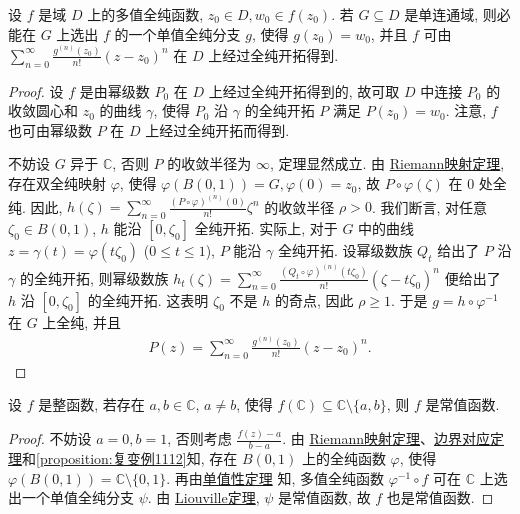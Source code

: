 \documentclass[../../main.tex]{subfiles}%
\begin{document}
\begin{theorem}[单值性定理]\label{theorem:单值性定理}
设 \(f\) 是域 \(D\) 上的多值全纯函数, \(z_0\in D, w_0\in f(z_0)\). 若 \(G\subseteq D\) 是单连通域, 则必能在 \(G\) 上选出 \(f\) 的一个单值全纯分支 \(g\), 使得 \(g(z_0)=w_0\), 并且 \(f\) 可由 \(\sum\limits_{n=0}^{\infty} \frac{g^{(n)}(z_0)}{n!}(z-z_0)^n\) 在 \(D\) 上经过全纯开拓得到.
\end{theorem}
\begin{proof}

设 \(f\) 是由幂级数 \(P_0\) 在 \(D\) 上经过全纯开拓得到的, 故可取 \(D\) 中连接 \(P_0\) 的收敛圆心和 \(z_0\) 的曲线 \(\gamma\), 使得 \(P_0\) 沿 \(\gamma\) 的全纯开拓 \(P\) 满足 \(P(z_0)=w_0\). 注意, \(f\) 也可由幂级数 \(P\) 在 \(D\) 上经过全纯开拓而得到.

不妨设 \(G\) 异于 \(\mathbb{C}\), 否则 \(P\) 的收敛半径为 \(\infty\), 定理显然成立. 由 \hyperref[theorem:Riemann映射定理]{Riemann映射定理}, 存在双全纯映射 \(\varphi\), 使得 \(\varphi(B(0,1))=G, \varphi(0)=z_0\), 故 \(P\circ \varphi(\zeta)\) 在 \(0\) 处全纯. 因此, \(h(\zeta)=\sum\limits_{n=0}^{\infty} \frac{(P\circ \varphi)^{(n)}(0)}{n!} \zeta^n\) 的收敛半径 \(\rho>0\). 我们断言, 对任意 \(\zeta_0 \in B(0,1)\), \(h\) 能沿 \([0,\zeta_0]\) 全纯开拓. 实际上, 对于 \(G\) 中的曲线 \(z=\gamma(t)=\varphi(t\zeta_0)\) (\(0\leqslant t\leqslant 1\)), \(P\) 能沿 \(\gamma\) 全纯开拓. 设幂级数族 \(Q_t\) 给出了 \(P\) 沿 \(\gamma\) 的全纯开拓, 则幂级数族 \(h_t(\zeta)=\sum\limits_{n=0}^{\infty} \frac{(Q_t \circ \varphi)^{(n)}(t\zeta_0)}{n!} (\zeta-t\zeta_0)^n\) 便给出了 \(h\) 沿 \([0,\zeta_0]\) 的全纯开拓. 这表明 \(\zeta_0\) 不是 \(h\) 的奇点, 因此 \(\rho\geqslant 1\). 于是 \(g=h\circ \varphi^{-1}\) 在 \(G\) 上全纯, 并且
\begin{align*}
P(z)=\sum_{n=0}^{\infty} \frac{g^{(n)}(z_0)}{n!} (z-z_0)^n.
\end{align*}
\end{proof}

\begin{theorem}
设 \(f\) 是整函数, 若存在 \(a,b\in\mathbb{C}\), \(a\neq b\), 使得 \(f(\mathbb{C})\subseteq \mathbb{C}\setminus\{a,b\}\), 则 \(f\) 是常值函数.
\end{theorem}
\begin{proof}
不妨设 \(a=0,b=1\), 否则考虑 \(\frac{f(z)-a}{b-a}\). 由 \hyperref[theorem:Riemann映射定理]{Riemann映射定理}、\hyperref[theorem:边界对应定理]{边界对应定理}和\cref{proposition:复变例1112}知, 存在 \(B(0,1)\) 上的全纯函数 \(\varphi\), 使得 \(\varphi(B(0,1))= \mathbb{C}\setminus\{0,1\}\). 再由\hyperref[theorem:单值性定理]{单值性定理} 知, 多值全纯函数 \(\varphi^{-1} \circ f\) 可在 \(\mathbb{C}\) 上选出一个单值全纯分支 \(\psi\). 由 \hyperref[theorem:Liouville(刘维尔)定理]{Liouville定理}, \(\psi\) 是常值函数, 故 \(f\) 也是常值函数. \end{proof}
\end{document}
